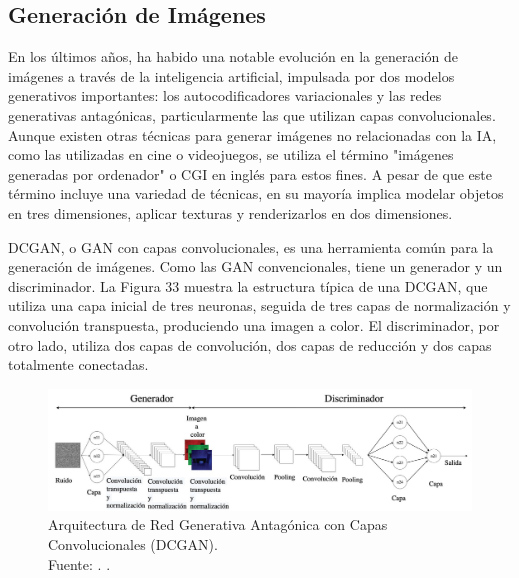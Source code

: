 \subsection{Generación de Imágenes}

En los últimos años, ha habido una notable evolución en la generación de imágenes a través de la inteligencia artificial, impulsada por dos modelos generativos importantes: los autocodificadores variacionales y las redes generativas antagónicas, particularmente las que utilizan capas convolucionales. Aunque existen otras técnicas para generar imágenes no relacionadas con la IA, como las utilizadas en cine o videojuegos, se utiliza el término "imágenes generadas por ordenador" o CGI en inglés para estos fines. A pesar de que este término incluye una variedad de técnicas, en su mayoría implica modelar objetos en tres dimensiones, aplicar texturas y renderizarlos en dos dimensiones. \parencite{tec_kingma2019variat}

DCGAN, o GAN con capas convolucionales, es una herramienta común para la generación de imágenes. Como las GAN convencionales, tiene un generador y un discriminador. La Figura 33 muestra la estructura típica de una DCGAN, que utiliza una capa inicial de tres neuronas, seguida de tres capas de normalización y convolución transpuesta, produciendo una imagen a color. El discriminador, por otro lado, utiliza dos capas de convolución, dos capas de reducción y dos capas totalmente conectadas. \parencite{tec_kingma2019variat}

\begin{figure}[!ht]
	\begin{center}
		\includegraphics[width=1\textwidth]{2/figures/genimagenes.jpg}
		\caption[Arquitectura de Red Generativa Antagónica con Capas Convolucionales (DCGAN)]{Arquitectura de Red Generativa Antagónica con Capas Convolucionales (DCGAN).\\
		Fuente: \cite{tec_kingma2019variat}. .}
		\label{2:fig50}
	\end{center}
\end{figure}

